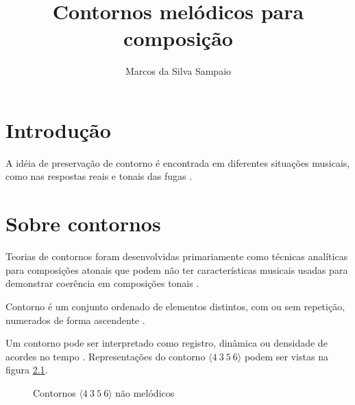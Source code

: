 \documentclass[12pt,brazil]{book}
\title{Contornos melódicos para composição}
\author{Marcos da Silva Sampaio}
\newcommand{\contorno}[1]{$\langle #1 \rangle$}
\begin{document}
\maketitle
\tableofcontents
\listoftables
\listoffigures

\chapter{Introdução}
\label{cha:introducao}

A idéia de preservação de contorno é encontrada em diferentes
situações musicais, como nas respostas reais e tonais das fugas
\cite[p. 29]{morris87:composition}.

\chapter{Sobre contornos}
\label{cha:sobre-contornos}



Teorias de contornos foram desenvolvidas primariamente como técnicas
analíticas para composições atonais que podem não ter características
musicais usadas para demonstrar coerência em composições tonais
\cite[p. 1]{beard03:contour}.

Contorno é um conjunto ordenado de elementos distintos, com ou sem
repetição, numerados de forma ascendente
\cite[p. 206]{morris93:directions}.

Um contorno pode ser interpretado como registro, dinâmica ou densidade
de acordes no tempo \cite[p. 206]{morris93:directions}
\cite[p. 22]{clifford95:contour}. Representações do contorno
\contorno{4\:3\:5\:6} podem ser vistas na figura
\ref{fig:non-melodic-contours}.

\begin{figure}
  \centering
  \qquad
  \qquad

  \caption{Contornos \contorno{4\:3\:5\:6} não melódicos}
  \label{fig:non-melodic-contours}
\end{figure}
\end{document}
